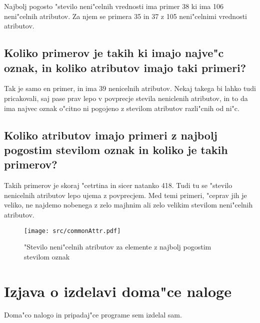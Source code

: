 \documentclass[a4paper,11pt]{article}
\begin{document}
Najbolj pogosto "stevilo neni"celnih vrednosti ima primer 38 ki ima 106 neni"celnih atributov. Za njem se primera 35 in 37 z 105 neni"celnimi vrednosti atributov.


\subsection{Koliko primerov je takih ki imajo najve"c oznak, in koliko atributov imajo taki primeri?}

Tak je samo en primer, in ima 39 nenicelnih atributov. Nekaj takega bi lahko tudi pricakovali, saj pase prav lepo v povprecje stevila neniclenih atributov, in to da ima najvec oznak o"citno ni pogojeno z stevilom atributov razli"cnih od ni"c.

\subsection{Koliko atributov imajo primeri z najbolj pogostim stevilom oznak in koliko je takih primerov?}

Takih primerov je skoraj "cetrtina in sicer natanko 418. Tudi tu se "stevilo nenicelnih atributov lepo ujema z povprecjem. Med temi primeri, "ceprav jih je veliko, ne najdemo nobenega z zelo majhnim ali zelo velikim stevilom neni"celnih atributov. 



\begin{figure}[H]
\begin{center}
\texttt{[image: src/commonAttr.pdf]}
\caption{"Stevilo neni"celnih atributov za elemente z najbolj pogostim stevilom oznak}
\label{slika2}
\end{center}
\end{figure}

%
%
%
%

\section{Izjava o izdelavi doma"ce naloge}
Doma"co nalogo in pripadaj"ce programe sem izdelal sam.
\end{document}
